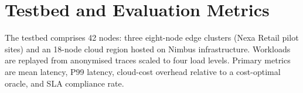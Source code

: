 \section{Testbed and Evaluation Metrics}
The testbed comprises 42 nodes: three eight-node edge clusters (Nexa Retail pilot sites) and an 18-node cloud region hosted on Nimbus infrastructure. Workloads are replayed from anonymised traces scaled to four load levels. Primary metrics are mean latency, P99 latency, cloud-cost overhead relative to a cost-optimal oracle, and SLA compliance rate.
